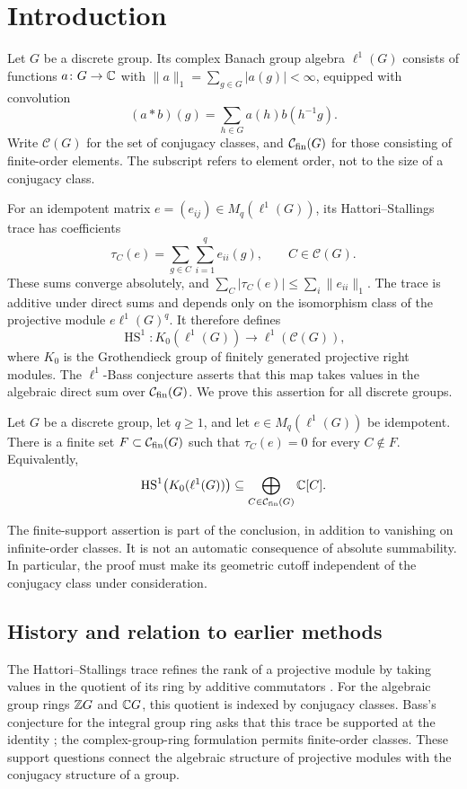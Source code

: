 \section{Introduction}\label{sec:introduction}

Let $G$ be a discrete group. Its complex Banach group algebra
$\ell^1(G)$ consists of functions $a\colon G\to\mathbb C$ with
$\|a\|_1=\sum_{g\in G}|a(g)|<\infty$, equipped with convolution
\[
 (a*b)(g)=\sum_{h\in G}a(h)b(h^{-1}g).
\]
Write $\mathcal C(G)$ for the set of conjugacy classes, and
$\mathcal C_{\rm fin}(G)$ for those consisting of finite-order elements.
The subscript refers to element order, not to the size of a conjugacy
class.

For an idempotent matrix $e=(e_{ij})\in M_q(\ell^1(G))$, its
Hattori--Stallings trace \cite{Hattori1965,Stallings1965} has coefficients
\begin{equation}\label{intro:trace}
 \tau_C(e)=\sum_{g\in C}\sum_{i=1}^q e_{ii}(g),
 \qquad C\in\mathcal C(G).
\end{equation}
These sums converge absolutely, and
$\sum_C|\tau_C(e)|\le\sum_i\|e_{ii}\|_1$.
The trace is additive under direct sums and depends only on the
isomorphism class of the projective module $e\ell^1(G)^q$.
It therefore defines
\[
 \operatorname{HS}^1\colon K_0(\ell^1(G))\longrightarrow
                           \ell^1(\mathcal C(G)),
\]
where $K_0$ is the Grothendieck group of finitely generated projective
right modules. The $\ell^1$-Bass conjecture
\cite[Conjecture~2.2]{BCM2004} asserts that this map takes values in the
algebraic direct sum over $\mathcal C_{\rm fin}(G)$.
We prove this assertion for all discrete groups.

\begin{theorem}\label{thm:main}
Let $G$ be a discrete group, let $q\ge1$, and let
$e\in M_q(\ell^1(G))$ be idempotent.
There is a finite set $F\subset\mathcal C_{\rm fin}(G)$ such that
$\tau_C(e)=0$ for every $C\notin F$. Equivalently,
\[
 \operatorname{HS}^1\bigl(K_0(\ell^1(G))\bigr)
 \subseteq \bigoplus_{C\in\mathcal C_{\rm fin}(G)}\mathbb C[C].
\]
\end{theorem}

The finite-support assertion is part of the conclusion, in addition to
vanishing on infinite-order classes. It is not an automatic consequence
of absolute summability. In particular, the proof must make its
geometric cutoff independent of the conjugacy class under consideration.

\subsection{History and relation to earlier methods}
The Hattori--Stallings trace refines the rank of a projective module by
taking values in the quotient of its ring by additive commutators
\cite{Hattori1965,Stallings1965}. For the algebraic group rings $\mathbb Z G$
and $\mathbb C G$, this quotient is indexed by conjugacy classes. Bass's
conjecture for the integral group
ring asks that this trace be supported at the identity
\cite{Bass1976}; the complex-group-ring formulation permits
finite-order classes. These support questions connect the algebraic
structure of projective modules with the conjugacy structure of a group.

